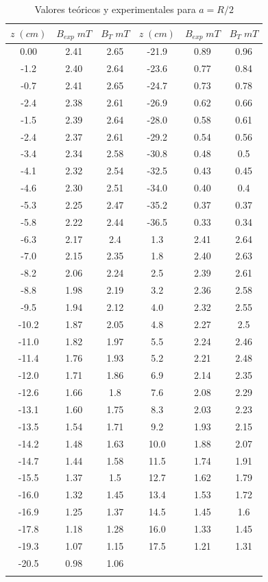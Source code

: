 \documentclass[a4paper,12pt,titlepage]{article}
\begin{document}
\begin{longtable}[t]{|c|c|c|c|c|c|}
    \hline
    $z \; (cm)$ & $B_{exp} \; mT$ & $B_T \; mT$ & $z \; (cm)$ & $B_{exp} \; mT$ & $B_T \; mT$ \\ \hline
    0.00     & 2.41 & 2.65 & -21.9 & 0.89 & 0.96 \\ \hline
    -1.2  & 2.40 & 2.64 & -23.6 & 0.77 & 0.84 \\ \hline
    -0.7  & 2.41 & 2.65 & -24.7 & 0.73 & 0.78 \\ \hline
    -2.4  & 2.38 & 2.61 & -26.9 & 0.62 & 0.66 \\ \hline
    -1.5  & 2.39 & 2.64 & -28.0 & 0.58 & 0.61 \\ \hline
    -2.4  & 2.37 & 2.61 & -29.2 & 0.54 & 0.56 \\ \hline
    -3.4  & 2.34 & 2.58 & -30.8 & 0.48 & 0.5  \\ \hline
    -4.1  & 2.32 & 2.54 & -32.5 & 0.43 & 0.45 \\ \hline
    -4.6  & 2.30 & 2.51 & -34.0 & 0.40 & 0.4  \\ \hline
    -5.3  & 2.25 & 2.47 & -35.2 & 0.37 & 0.37 \\ \hline
    -5.8  & 2.22 & 2.44 & -36.5 & 0.33 & 0.34 \\ \hline
    -6.3  & 2.17 & 2.4  & 1.3   & 2.41 & 2.64 \\ \hline
    -7.0  & 2.15 & 2.35 & 1.8   & 2.40 & 2.63 \\ \hline
    -8.2  & 2.06 & 2.24 & 2.5   & 2.39 & 2.61 \\ \hline
    -8.8  & 1.98 & 2.19 & 3.2   & 2.36 & 2.58 \\ \hline
    -9.5  & 1.94 & 2.12 & 4.0   & 2.32 & 2.55 \\ \hline
    -10.2 & 1.87 & 2.05 & 4.8   & 2.27 & 2.5  \\ \hline
    -11.0 & 1.82 & 1.97 & 5.5   & 2.24 & 2.46 \\ \hline
    -11.4 & 1.76 & 1.93 & 5.2   & 2.21 & 2.48 \\ \hline
    -12.0 & 1.71 & 1.86 & 6.9   & 2.14 & 2.35 \\ \hline
    -12.6 & 1.66 & 1.8  & 7.6   & 2.08 & 2.29 \\ \hline
    -13.1 & 1.60 & 1.75 & 8.3   & 2.03 & 2.23 \\ \hline
    -13.5 & 1.54 & 1.71 & 9.2   & 1.93 & 2.15 \\ \hline
    -14.2 & 1.48 & 1.63 & 10.0  & 1.88 & 2.07 \\ \hline
    -14.7 & 1.44 & 1.58 & 11.5  & 1.74 & 1.91 \\ \hline
    -15.5 & 1.37 & 1.5  & 12.7  & 1.62 & 1.79 \\ \hline
    -16.0 & 1.32 & 1.45 & 13.4  & 1.53 & 1.72 \\ \hline
    -16.9 & 1.25 & 1.37 & 14.5  & 1.45 & 1.6  \\ \hline
    -17.8 & 1.18 & 1.28 & 16.0  & 1.33 & 1.45 \\ \hline
    -19.3 & 1.07 & 1.15 & 17.5  & 1.21 & 1.31 \\ \hline
    -20.5 & 0.98 & 1.06 &       &      &      \\ \hline
    \caption{Valores teóricos y experimentales para $a=R/2$}
\end{longtable}
\end{document}
